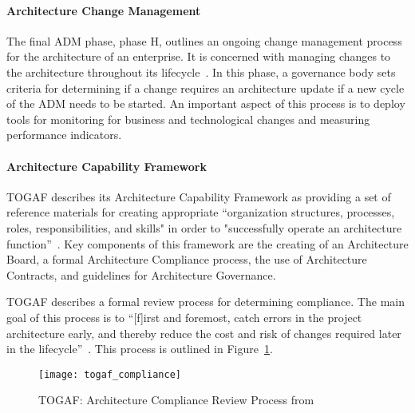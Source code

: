 \paragraph*{Architecture Change Management}

The final ADM phase, phase H, outlines an ongoing change management process for the architecture of an enterprise.  It is concerned with managing changes to the architecture throughout its lifecycle~\cite[Ch. 16]{togaf9.1}. In this phase, a governance body sets criteria for determining if a change requires an architecture update if a new cycle of the ADM needs to be started. An important aspect of this process is to deploy tools for monitoring for business and technological changes and measuring performance indicators. 

\paragraph*{Architecture Capability Framework}

TOGAF describes its Architecture Capability Framework as providing a set of reference materials for creating appropriate ``organization structures, processes, roles, responsibilities, and skills" in order to "successfully operate an architecture function''~\cite[Sec. 45.1]{togaf9.1}. Key components of this framework are the creating of an Architecture Board, a formal Architecture Compliance process, the use of Architecture Contracts, and guidelines for Architecture Governance. 

TOGAF describes a formal review process for determining compliance. The main goal of this process is to ``[f]irst and foremost, catch errors in the project architecture early, and thereby reduce the cost and risk of changes required later in the lifecycle''~\cite[Ch. 48.3.1]{togaf9.1}. This process is outlined in Figure~\ref{fig:togaf_compliance}.

\begin{figure}
\centering
\texttt{[image: togaf\_compliance]}
\caption{TOGAF: Architecture Compliance Review Process from \cite[Ch. 48.4.1]{togaf9.1}}
\label{fig:togaf_compliance}
\end{figure}



